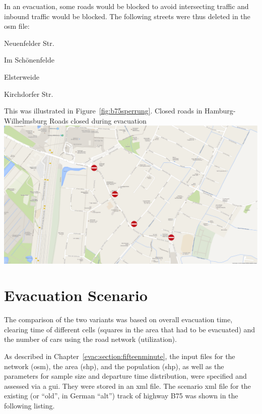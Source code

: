 In an evacuation, some roads would be blocked to avoid intersecting traffic and inbound traffic would be blocked. The following streets were thus deleted in the \gls{osm} file:
%
\begin{compactitem}
	\item Neuenfelder Str. 
	\item Im Schönenfelde
	\item Elsterweide
	\item Kirchdorfer Str.
\end{compactitem}
%
This was illustrated in Figure~\ref{fig:b75sperrung}.
%
%
\createfigure%
{Closed roads in Hamburg-Wilhelmsburg}%
{Roads closed during evacuation}%
{\label{fig:b75sperrung}}%
{\includegraphics[width=0.7\linewidth]{scenarios/figures/B75sperrung}}%
{}

\section{Evacuation Scenario}
The comparison of the two variants was based on overall evacuation time, clearing time of different cells (squares in the area that had to be evacuated) and the number of cars using the road network (utilization).

As described in Chapter~\ref{evac:section:fifteenminute}, the input files for the network (\gls{osm}), the area (shp), and the population (shp), as well as the parameters for sample size and departure time distribution, were specified and assessed via a \gls{gui}. They were stored in an \gls{xml} file. The scenario \gls{xml} file for the existing (or ``old'', in German ``alt'') track of highway B75 was shown in the following listing. 



